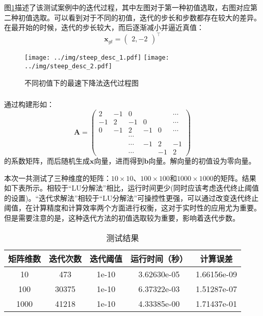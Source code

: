 \documentclass[12pt, onecolumn]{article}
\newcommand\normf{\fangsong}
\begin{document}
	图\ref{fig:最速下降法迭代过程图}描述了该测试案例中的迭代过程，其中左图对于第一种初值选取，右图对应第二种初值选取。可以看到对于不同的初值，迭代的步长和步数都存在较大的差异。在最开始的时候，迭代的步长较大，而后逐渐减小并逼近真值：
	\begin{equation}
	\boldsymbol{x}_{gt}=\begin{pmatrix}
	2,-2
	\end{pmatrix}^\top
	\end{equation}
		\begin{figure}[h]
			\centering
			\texttt{[image: ../img/steep\_desc\_1.pdf]}
			\texttt{[image: ../img/steep\_desc\_2.pdf]}
			\caption{\normf 不同初值下的最速下降法迭代过程图}
			\label{fig:最速下降法迭代过程图}
		\end{figure}
	
	\subsubsection{\normf{大型稀疏矩阵测试}}
	通过构建形如：
	\begin{equation}
	\boldsymbol{A}=\begin{pmatrix}
	2&-1&0&&&\cdots\\
	-1&2&-1&0&&\cdots\\
	0&-1&2&-1&0&\cdots\\
	&&\cdots\\
	&&\cdots&-1&2&-1\\
	&&\cdots&&-1&2
	\end{pmatrix}
	\end{equation}
	的系数矩阵，而后随机生成$\boldsymbol{x}$向量，进而得到$\boldsymbol{b}$向量。解向量的初值设为零向量。
	
	本次一共测试了三种维度的矩阵：$10\times 10$、$100\times 100$和$1000\times 1000$的矩阵。结果如下表所示。相较于“LU分解法”相比，运行时间更少(同时应该考虑迭代终止阈值的设置)。“迭代求解法”相较于“LU分解法”可操控性更强，可以通过改变迭代终止阈值，在计算精度和计算效率两个方面进行权衡，这对于实时性的应用尤为重要。但是需要注意的是，这种迭代方法的初值选取较为重要，影响着迭代步数。
	\begin{table}[h]
	\normf
	\centering
	\caption{\normf 测试结果}
	\vspace{2mm}
	\begin{tabular}{c|cccc}
	\toprule
	矩阵维数 & 迭代次数  & 迭代阈值  & 运行时间（秒）     & 计算误差        \\ \midrule
	10   & 473   & 1e-10 & 3.62630e-05 & 1.66156e-09 \\
	100  & 30375 & 1e-10 & 6.37322e-03 & 1.51287e-07 \\
	1000 & 41218 & 1e-10 & 4.33385e-00 & 1.71437e-01 \\ \bottomrule
	\end{tabular}
	\end{table}
\end{document}

